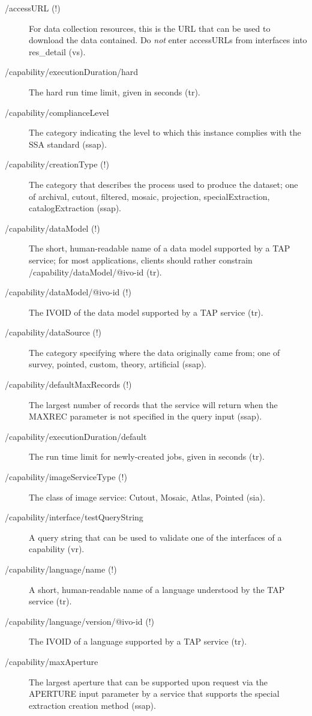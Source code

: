 \documentclass[11pt,a4paper]{ivoa}
\begin{document}
\begin{description}
\item[/accessURL (!)]For data collection resources, this is
the URL that can be used to download the data contained.  Do
\emph{not} enter accessURLs from interfaces into res\_detail (vs).
\item[/capability/executionDuration/hard]The hard run time limit, given in seconds (tr).
\item[/capability/complianceLevel]The category indicating the level to which this instance complies with the SSA standard (ssap).
\item[/capability/creationType (!)]The category that describes the process used to produce the dataset; one of archival, cutout, filtered, mosaic, projection, specialExtraction, catalogExtraction (ssap).
\item[/capability/dataModel (!)]The short, human-readable name of a data model supported by a TAP service; for most applications, clients should rather constrain /capability/dataModel/@ivo-id (tr).  
\item[/capability/dataModel/@ivo-id (!)]The IVOID of the data model supported by a TAP service (tr).
\item[/capability/dataSource (!)]The category specifying where the data originally came from; one of survey, pointed, custom, theory, artificial (ssap).
\item[/capability/defaultMaxRecords (!)]The largest number of records that the service will return when the MAXREC parameter is not specified in the query input (ssap).
\item[/capability/executionDuration/default]The run time limit for newly-created jobs, given in seconds (tr).
\item[/capability/imageServiceType (!)]The class of image service: Cutout, Mosaic, Atlas, Pointed (sia).
\item[/capability/interface/testQueryString] A query string that can be
used to validate one of the interfaces of a capability (vr).
\item[/capability/language/name (!)]A short, human-readable name of a language understood by the TAP service (tr).
\item[/capability/language/version/@ivo-id (!)]The IVOID of a language supported by a TAP service (tr).
\item[/capability/maxAperture]The largest aperture that can be supported upon request via the APERTURE input parameter by a service that supports the special extraction creation method (ssap).

\end{description}
\end{document}
